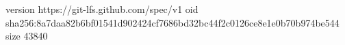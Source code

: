 version https://git-lfs.github.com/spec/v1
oid sha256:8a7daa82b6bf01541d902424cf7686bd32bc44f2c0126ce8e1e0b70b974be544
size 43840
